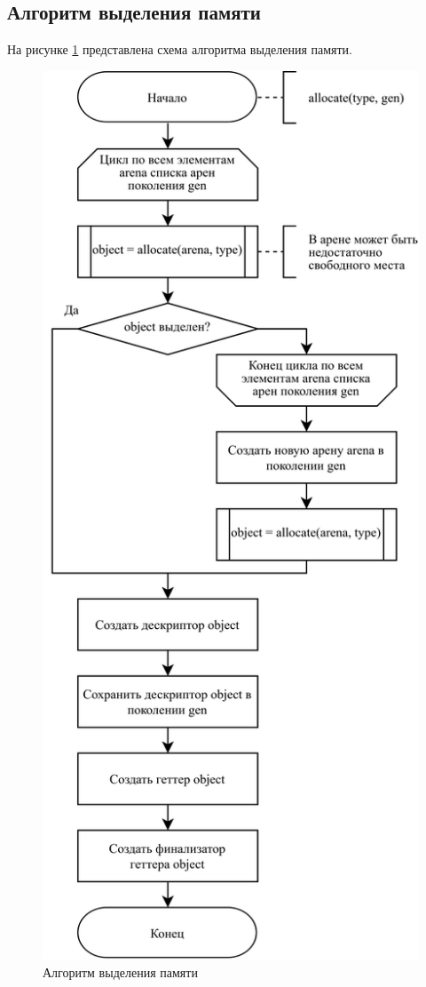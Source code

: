 \subsection{Алгоритм выделения памяти}

На рисунке \ref{fig:allocation} представлена схема алгоритма выделения памяти.

\begin{figure}[H]
	\centering
	\includegraphics[height=0.95\textheight]{assets/allocate.png}
	\caption{Алгоритм выделения памяти}
	\label{fig:allocation}
\end{figure}

